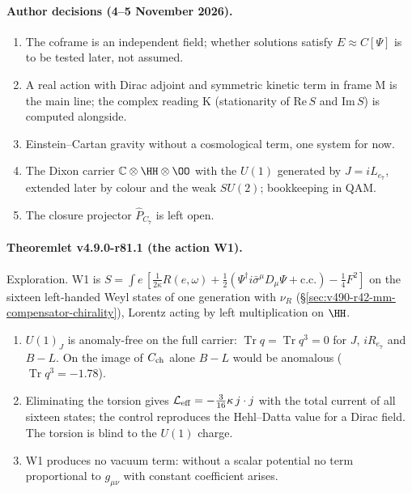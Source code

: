 \paragraph{Author decisions (4--5 November 2026).}
\begin{enumerate}[leftmargin=2em]
\item The coframe is an independent field; whether solutions satisfy \(E\approx C[\Psi]\) is to be tested later, not assumed.
\item A real action with Dirac adjoint and symmetric kinetic term in frame M is the main line; the complex reading K (stationarity
of \(\mathrm{Re}\,S\) and \(\mathrm{Im}\,S\)) is computed alongside.
\item Einstein--Cartan gravity without a cosmological term, one system for now.
\item The Dixon carrier \(\mathbb C\otimes\HH\otimes\OO\) with the \(U(1)\) generated by \(J=iL_{e_7}\), extended later by colour and the weak
\(SU(2)\); bookkeeping in QAM.
\item The closure projector \(\hat P_{C_7}\) is left open.
\end{enumerate}

\paragraph{Theoremlet v4.9.0-r81.1 (the action W1).}
Exploration.  W1 is \(S=\int e\,[\tfrac1{2\kappa}R(e,\omega)+\tfrac12(\Psi^\dagger i\bar\sigma^\mu D_\mu\Psi+\mathrm{c.c.})-\tfrac14F^2]\) on the sixteen
left-handed Weyl states of one generation with \(\nu_R\) (\S\ref{sec:v490-r42-mm-compensator-chirality}), Lorentz acting by left
multiplication on \(\HH\).
\begin{enumerate}[leftmargin=2em]
\item[(a)] \(U(1)_J\) is anomaly-free on the full carrier: \(\operatorname{Tr}q=\operatorname{Tr}q^3=0\) for \(J\), \(iR_{e_7}\) and \(B-L\).  On the
image of \(C_{\rm ch}\) alone \(B-L\) would be anomalous (\(\operatorname{Tr}q^3=-1.78\)).
\item[(b)] Eliminating the torsion gives \(\mathcal L_{\rm eff}=-\tfrac3{16}\kappa\,j\cdot j\) with the total current of all sixteen states; the
control reproduces the Hehl--Datta value for a Dirac field.  The torsion is blind to the \(U(1)\) charge.
\item[(c)] W1 produces no vacuum term: without a scalar potential no term proportional to \(g_{\mu\nu}\) with constant coefficient arises.
\end{enumerate}

